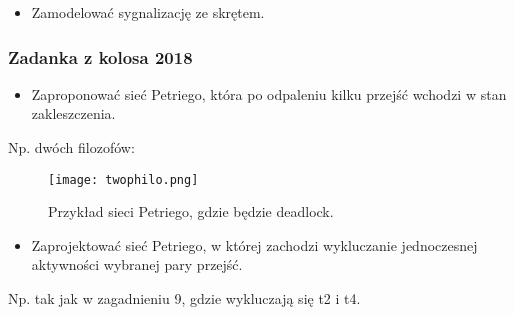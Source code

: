 \documentclass[a4paper,15pt]{article}
\begin{document}
\begin{framed}
\begin{itemize}
\item Zamodelować sygnalizację ze skrętem.
\end{itemize}
\end{framed}


\newpage
\subsubsection{Zadanka z kolosa 2018}
\begin{framed}
\begin{itemize}
\item Zaproponować sieć Petriego, która po odpaleniu kilku przejść wchodzi w stan zakleszczenia.
\end{itemize}
\end{framed}

Np. dwóch filozofów:
\begin{figure}[H]
\centerline{\texttt{[image: twophilo.png]}}
\caption{Przykład sieci Petriego, gdzie będzie deadlock.}
\label{fig:twophilo}
\end{figure}

\begin{framed}
\begin{itemize}
\item Zaprojektować sieć Petriego, w której zachodzi wykluczanie jednoczesnej aktywności wybranej pary przejść.
\end{itemize}
\end{framed}

Np. tak jak w zagadnieniu 9, gdzie wykluczają się t2 i t4.
\end{document}
